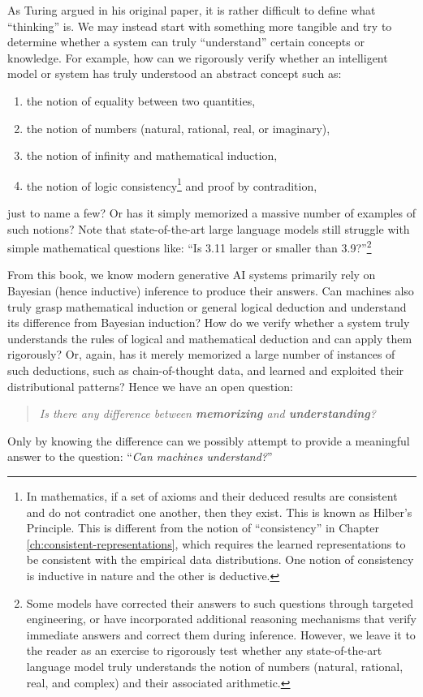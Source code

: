 \documentclass[../../book-main.tex]{subfiles}
\begin{document}
As Turing argued in his original paper, it is rather difficult
to define what ``thinking'' is. We may instead start with something more
tangible and try to determine whether a system can truly
``understand'' certain concepts or knowledge. For example, how can we
rigorously verify whether an intelligent model or system has truly
understood an abstract concept such as:
\begin{enumerate}
    \item the notion of equality between two quantities,
    \item the notion of numbers (natural, rational, real, or imaginary),
    \item the notion of infinity and mathematical induction,
    \item the notion of logic consistency\footnote{In mathematics, if a set of axioms and their deduced results are consistent and 
    do not contradict one another, then they exist. This is known as Hilber's Principle. This is different from the 
    notion of ``consistency'' in Chapter \ref{ch:consistent-representations}, which requires the learned
    representations to be consistent with the empirical data distributions. One notion of consistency is inductive in nature 
    and the other is deductive.} and proof by contradition,
\end{enumerate}
just to name a few? Or has it simply memorized a massive number of
examples of such notions? Note that state-of-the-art large language
models still struggle with simple mathematical questions like: ``Is
3.11 larger or smaller than 3.9?''\footnote{Some models have
    corrected their answers to such questions through targeted
    engineering, or have incorporated additional reasoning mechanisms
    that verify immediate answers and correct them during inference.
    However, we leave it to the reader as an exercise to rigorously test
    whether any state-of-the-art language model truly understands the
    notion of numbers (natural, rational, real, and complex) and their
associated arithmetic.}

From this book, we know modern generative AI systems primarily rely
on Bayesian (hence inductive) inference to produce their answers. Can
machines also truly grasp mathematical induction or general logical
deduction and understand its difference from Bayesian induction?
How do we verify whether a system truly understands the rules of
logical and mathematical deduction and can apply them rigorously? Or,
again, has it merely memorized a large number of instances of such
deductions, such as chain-of-thought data, and learned and
exploited their distributional patterns? Hence we have an open question:
\begin{quote}
    \centering
    \textit{Is there any difference between \textbf{memorizing} and
    \textbf{understanding}?}
\end{quote}
Only by knowing the difference can we possibly attempt to provide a
meaningful answer to the question: ``\textit{Can machines understand?}''
\end{document}
